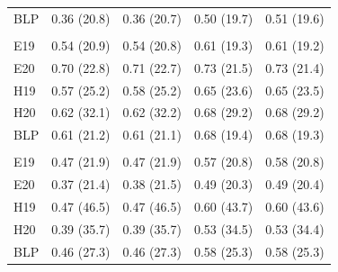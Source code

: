 \documentclass[
  letterpaper,
  DIV=11,
  numbers=noendperiod]{scrartcl}
\begin{document}
\begin{table}
{\begin{tabular}{lllll}
\hspace{1em}BLP & 0.36 (20.8) & 0.36 (20.7) & 0.50 (19.7) & 0.51 (19.6)\\
\addlinespace[0.3em]
\multicolumn{5}{l}{\textbf{TV}}\\
\hspace{1em}E19 & 0.54 (20.9) & 0.54 (20.8) & 0.61 (19.3) & 0.61 (19.2)\\
\hspace{1em}E20 & 0.70 (22.8) & 0.71 (22.7) & 0.73 (21.5) & 0.73 (21.4)\\
\hspace{1em}H19 & 0.57 (25.2) & 0.58 (25.2) & 0.65 (23.6) & 0.65 (23.5)\\
\hspace{1em}H20 & 0.62 (32.1) & 0.62 (32.2) & 0.68 (29.2) & 0.68 (29.2)\\
\hspace{1em}BLP & 0.61 (21.2) & 0.61 (21.1) & 0.68 (19.4) & 0.68 (19.3)\\
\addlinespace[0.3em]
\multicolumn{5}{l}{\textbf{TY}}\\
\hspace{1em}E19 & 0.47 (21.9) & 0.47 (21.9) & 0.57 (20.8) & 0.58 (20.8)\\
\hspace{1em}E20 & 0.37 (21.4) & 0.38 (21.5) & 0.49 (20.3) & 0.49 (20.4)\\
\hspace{1em}H19 & 0.47 (46.5) & 0.47 (46.5) & 0.60 (43.7) & 0.60 (43.6)\\
\hspace{1em}H20 & 0.39 (35.7) & 0.39 (35.7) & 0.53 (34.5) & 0.53 (34.4)\\
\hspace{1em}BLP & 0.46 (27.3) & 0.46 (27.3) & 0.58 (25.3) & 0.58 (25.3)\\
\bottomrule
\end{tabular}}
\end{table}
\end{document}
